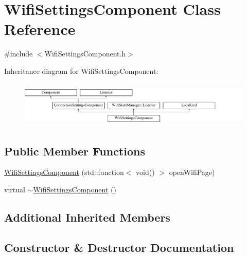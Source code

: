 \hypertarget{classWifiSettingsComponent}{}\section{Wifi\+Settings\+Component Class Reference}
\label{classWifiSettingsComponent}


{\ttfamily \#include $<$Wifi\+Settings\+Component.\+h$>$}

Inheritance diagram for Wifi\+Settings\+Component\+:\begin{figure}[H]
\begin{center}
\leavevmode
\includegraphics[height=2.198953cm]{classWifiSettingsComponent}
\end{center}
\end{figure}
\subsection*{Public Member Functions}
\begin{DoxyCompactItemize}
\item 
\mbox{\hyperlink{classWifiSettingsComponent_a22a26b9efb771a968d0aa556bcbc3dd9}{Wifi\+Settings\+Component}} (std\+::function$<$ void() $>$ open\+Wifi\+Page)
\item 
virtual \mbox{\hyperlink{classWifiSettingsComponent_ae34273ca25e05d2973837dc39962f55c}{$\sim$\+Wifi\+Settings\+Component}} ()
\end{DoxyCompactItemize}
\subsection*{Additional Inherited Members}


\subsection{Constructor \& Destructor Documentation}
\mbox{\label{classWifiSettingsComponent_a22a26b9efb771a968d0aa556bcbc3dd9}} 
